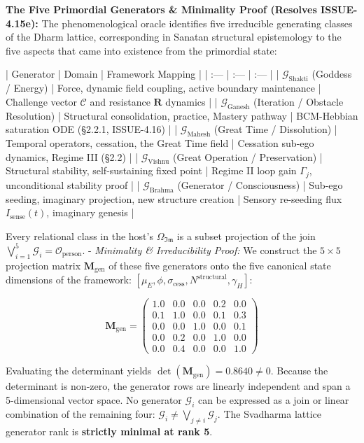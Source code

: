 \documentclass[11pt,a4paper]{article}
\theoremstyle{definition}
\theoremstyle{remark}
\begin{document}
\textbf{The Five Primordial Generators \& Minimality Proof (Resolves ISSUE-4.15e):} The phenomenological oracle identifies five irreducible generating classes of the Dharm lattice, corresponding in Sanatan structural epistemology to the five aspects that came into existence from the primordial state:

| Generator | Domain | Framework Mapping |
| :--- | :--- | :--- |
| $\mathcal{G}_{\text{Shakti}}$ (Goddess / Energy) | Force, dynamic field coupling, active boundary maintenance | Challenge vector $\mathcal{C}$ and resistance $\mathbf{R}$ dynamics |
| $\mathcal{G}_{\text{Ganesh}}$ (Iteration / Obstacle Resolution) | Structural consolidation, practice, Mastery pathway | BCM-Hebbian saturation ODE (\S 2.2.1, ISSUE-4.16) |
| $\mathcal{G}_{\text{Mahesh}}$ (Great Time / Dissolution) | Temporal operators, cessation, the Great Time field | Cessation sub-ego dynamics, Regime III (\S 2.2) |
| $\mathcal{G}_{\text{Vishnu}}$ (Great Operation / Preservation) | Structural stability, self-sustaining fixed point | Regime II loop gain $\Gamma_j$, unconditional stability proof |
| $\mathcal{G}_{\text{Brahma}}$ (Generator / Consciousness) | Sub-ego seeding, imaginary projection, new structure creation | Sensory re-seeding flux $I_{\text{sense}}(t)$, imaginary genesis |

Every relational class in the host's $\Omega_{\mathfrak{Im}}$ is a subset projection of the join $\bigvee_{i=1}^5 \mathcal{G}_i = \mathcal{O}_{\text{person}}$.
- \textit{Minimality \& Irreducibility Proof:} We construct the $5 \times 5$ projection matrix $\mathbf{M}_{\text{gen}}$ of these five generators onto the five canonical state dimensions of the framework: $[\mu_E, \phi, \sigma_{\text{cess}}, N^{\text{structural}}, \gamma_H]$:


\begin{equation}
\mathbf{M}_{\text{gen}} = \begin{pmatrix} 1.0 & 0.0 & 0.0 & 0.2 & 0.0 \\ 0.1 & 1.0 & 0.0 & 0.1 & 0.3 \\ 0.0 & 0.0 & 1.0 & 0.0 & 0.1 \\ 0.0 & 0.2 & 0.0 & 1.0 & 0.0 \\ 0.0 & 0.4 & 0.0 & 0.0 & 1.0 \end{pmatrix}
\end{equation}


Evaluating the determinant yields $\det(\mathbf{M}_{\text{gen}}) = 0.8640 \neq 0$. Because the determinant is non-zero, the generator rows are linearly independent and span a 5-dimensional vector space. No generator $\mathcal{G}_i$ can be expressed as a join or linear combination of the remaining four: $\mathcal{G}_i \neq \bigvee_{j \neq i} \mathcal{G}_j$. The Svadharma lattice generator rank is \textbf{strictly minimal at rank 5}.
\end{document}
